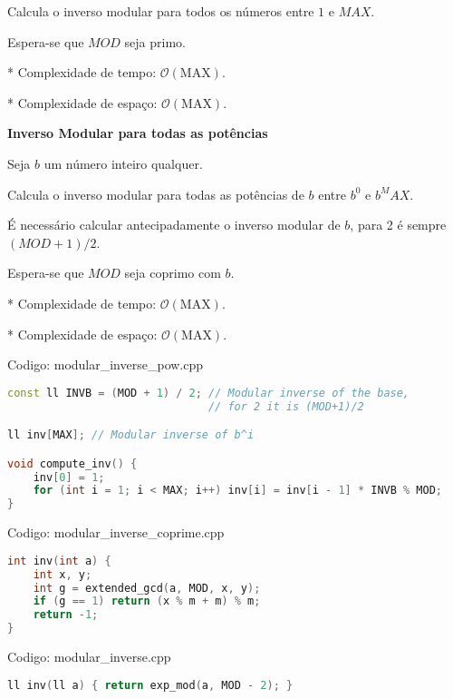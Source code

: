 \documentclass[10pt, a4paper, oneside]{book}
\begin{document}
Calcula o inverso modular para todos os números entre $1$ e $MAX$.



Espera-se que $MOD$ seja primo.



* Complexidade de tempo: $\mathcal{O}(\text{MAX})$.

* Complexidade de espaço: $\mathcal{O}(\text{MAX})$.



\textbf{Inverso Modular para todas as potências} 



Seja $b$ um número inteiro qualquer.



Calcula o inverso modular para todas as potências de $b$ entre $b^0$ e $b^MAX$.



É necessário calcular antecipadamente o inverso modular de $b$, para 2 é sempre $(MOD+1)/2$.



Espera-se que $MOD$ seja coprimo com $b$.



* Complexidade de tempo: $\mathcal{O}(\text{MAX})$.

* Complexidade de espaço: $\mathcal{O}(\text{MAX})$.
\hfill

Codigo: modular\_inverse\_pow.cpp

\begin{lstlisting}[language=C++]
const ll INVB = (MOD + 1) / 2; // Modular inverse of the base,
                               // for 2 it is (MOD+1)/2

ll inv[MAX]; // Modular inverse of b^i

void compute_inv() {
    inv[0] = 1;
    for (int i = 1; i < MAX; i++) inv[i] = inv[i - 1] * INVB % MOD;
}
\end{lstlisting}
\hfill

Codigo: modular\_inverse\_coprime.cpp

\begin{lstlisting}[language=C++]
int inv(int a) {
    int x, y;
    int g = extended_gcd(a, MOD, x, y);
    if (g == 1) return (x % m + m) % m;
    return -1;
}
\end{lstlisting}
\hfill

Codigo: modular\_inverse.cpp

\begin{lstlisting}[language=C++]
ll inv(ll a) { return exp_mod(a, MOD - 2); }
\end{lstlisting}
\hfill
\end{document}

